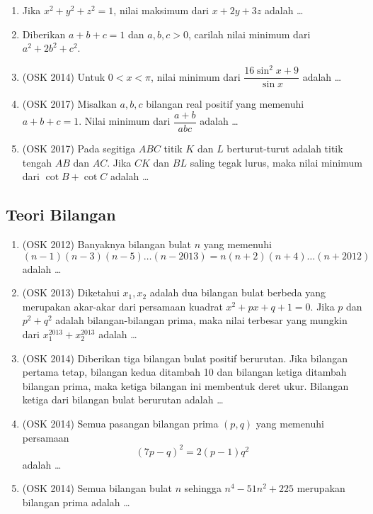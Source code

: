 \documentclass[11pt]{scrartcl}
\begin{document}
\begin{enumerate}
        \item Jika $x^2+y^2+z^2=1$, nilai maksimum dari $x+2y+3z$ adalah \dots
        
        \item Diberikan $a+b+c=1$ dan $a,b,c>0$, carilah nilai minimum dari $a^2+2b^2+c^2$.
        
        \item (OSK 2014) Untuk $0 < x < \pi$, nilai minimum dari $\dfrac{16 \sin^2 x + 9}{\sin x}$ adalah \dots
        
        \item (OSK 2017) Misalkan $a,b,c$ bilangan real positif yang memenuhi $a+b+c=1$. Nilai minimum dari $\dfrac{a+b}{abc}$ adalah \dots
        
        \item (OSK 2017) Pada segitiga $ABC$ titik $K$ dan $L$ berturut-turut adalah titik tengah $AB$ dan $AC$. Jika $CK$ dan $BL$ saling tegak lurus, maka nilai minimum dari $\cot B + \cot C$ adalah \dots
    \end{enumerate}
    \subsection{Teori Bilangan}
        \begin{enumerate}
            \item (OSK 2012) Banyaknya bilangan bulat $n$ yang memenuhi $$(n-1)(n-3)(n-5)\dots(n-2013)=n(n+2)(n+4)\dots (n+2012)$$ adalah \dots
            
            \item (OSK 2013) Diketahui $x_1,x_2$ adalah dua bilangan bulat berbeda yang merupakan akar-akar dari persamaan kuadrat $x^2+px+q+1=0$. Jika $p$ dan $p^2+q^2$ adalah bilangan-bilangan prima, maka nilai terbesar yang mungkin dari $x_1^{2013}+x_2^{2013}$ adalah \dots
            
            \item (OSK 2014) Diberikan tiga bilangan bulat positif berurutan. Jika bilangan pertama tetap, bilangan kedua ditambah 10 dan bilangan ketiga ditambah bilangan prima, maka ketiga bilangan ini membentuk deret ukur. Bilangan ketiga dari bilangan bulat berurutan adalah \dots
            
            \item (OSK 2014) Semua pasangan bilangan prima $(p,q)$ yang memenuhi persamaan
            $$(7p-q)^2=2(p-1)q^2$$
            adalah \dots
            
            \item (OSK 2014) Semua bilangan bulat $n$ sehingga $n^4-51n^2+225$ merupakan bilangan prima adalah \dots
        \end{enumerate}
        
\end{document}
